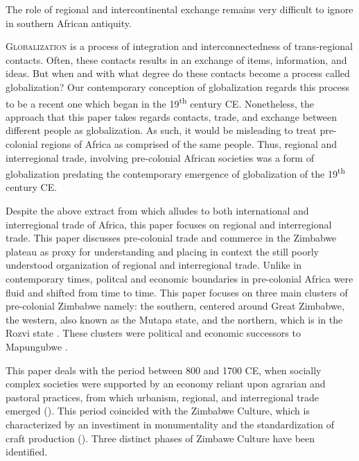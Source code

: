\begin{IJSRAquote}{\cite[6]{pikirayi2017}}
{The role of regional and intercontinental exchange remains very difficult to ignore in southern African antiquity.}
\end{IJSRAquote}
\lettrine{G}{lobalization} is a process of integration and interconnectedness of trans-regional contacts. Often, these contacts results in an exchange of items, information, and ideas. But when and with what degree do these contacts become a process called globalization? Our contemporary conception of globalization regards this process to be a recent one which began in the 19\textsuperscript{th} century CE. Nonetheless, the approach that this paper takes regards contacts, trade, and exchange between different people as globalization. As such, it would be misleading to treat pre-colonial regions of Africa as comprised of the same people. Thus, regional and interregional trade, involving pre-colonial African societies was a form of globalization predating the contemporary emergence of globalization of the 19\textsuperscript{th} century CE.

Despite the above extract from \parencite{pikirayi2017} which alludes to both international and interregional trade of Africa, this paper focuses on regional and interregional trade. This paper discusses pre-colonial trade and commerce in the Zimbabwe plateau as proxy for understanding and placing in context the still poorly understood  organization of regional and interregional trade. Unlike in contemporary times, politcal and economic boundaries in pre-colonial Africa were fluid and shifted from time to time. This paper focuses on three main clusters of pre-colonial Zimbabwe namely: the southern, centered around Great Zimbabwe, the western, also known as the Mutapa state, and the northern, which is in the Rozvi state .
These clusters were political and economic successors to Mapungubwe
\parencites{huffman2000}{huffman2009}{huffman2015}{pikirayi1993}{pikirayi2001}{pwiti2005}.

This paper deals with the period between 800 and 1700 CE, when socially complex societies were supported by an economy reliant upon agrarian and pastoral practices, from which urbanism,  regional, and interregional trade emerged (\cites{huffman1986}{pwiti2005}{mitchell2002}). This period coincided with the Zimbabwe Culture, which is characterized by an investiment in monumentality and the standardization of craft production (\cites{pikirayi2001}{pikirayi2013archit}{huffman1996}{kim2008}). Three distinct phases of Zimbawe Culture have been identified.

